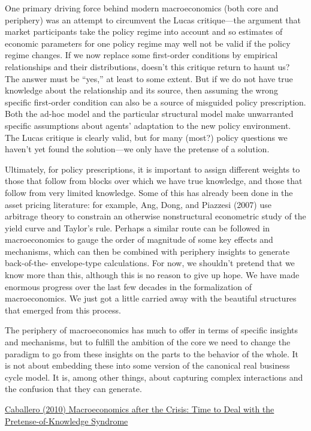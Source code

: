 \documentclass[
]{book}
\begin{document}
One primary driving force behind modern macroeconomics (both core and periphery)
was an attempt to circumvent the Lucas critique---the argument that market participants take the
policy regime into account and so estimates of economic parameters for one policy regime may
well not be valid if the policy regime changes. If we now replace some first-order conditions by
empirical relationships and their distributions, doesn't this critique return to haunt us? The
answer must be ``yes,'' at least to some extent. But if we do not have true knowledge about the
relationship and its source, then assuming the wrong specific first-order condition can also be a
source of misguided policy prescription. Both the ad-hoc model and the particular structural
model make unwarranted specific assumptions about agents' adaptation to the new policy
environment. The Lucas critique is clearly valid, but for many (most?) policy questions we
haven't yet found the solution---we only have the pretense of a solution.

Ultimately, for policy prescriptions, it is important to assign different weights to those
that follow from blocks over which we have true knowledge, and those that follow from very
limited knowledge. Some of this has already been done in the asset pricing literature: for
example, Ang, Dong, and Piazzesi (2007) use arbitrage theory to constrain an otherwise
nonstructural econometric study of the yield curve and Taylor's rule. Perhaps a similar route can
be followed in macroeconomics to gauge the order of magnitude of some key effects and
mechanisms, which can then be combined with periphery insights to generate back-of-the-
envelope-type calculations. For now, we shouldn't pretend that we know more than this, although
this is no reason to give up hope. We have made enormous progress over the last few decades in
the formalization of macroeconomics. We just got a little carried away with the beautiful
structures that emerged from this process.

The periphery of macroeconomics has much to offer in terms of specific insights and
mechanisms, but to fulfill the ambition of the core we need to change the paradigm to go from
these insights on the parts to the behavior of the whole. It is not about embedding these into
some version of the canonical real business cycle model. It is, among other things, about
capturing complex interactions and the confusion that they can generate.

\href{pdf/Caballero_2010_Macro_after_Crisis.pdf}{Caballero (2010) Macroeconomics after the Crisis: Time to Deal with the Pretense-of-Knowledge Syndrome}
\end{document}
